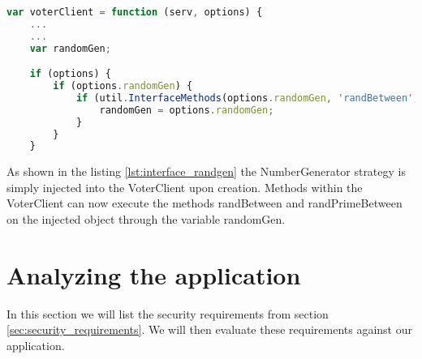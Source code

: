 \begin{lstlisting}[language=Javascript, caption=Checking for an interface, label=lst:interface_randgen]
var voterClient = function (serv, options) {
    ...
    ...
    var randomGen;                     

    if (options) {
        if (options.randomGen) {
            if (util.InterfaceMethods(options.randomGen, 'randBetween', 'randPrimeBetween')) {
                randomGen = options.randomGen;
            }
        }
    } 
\end{lstlisting}
 
\noindent
As shown in the listing \ref{lst:interface_randgen} the NumberGenerator strategy is simply injected
into the VoterClient upon creation. Methods within the VoterClient can now execute the methods
randBetween and randPrimeBetween on the injected object through the variable randomGen. 
 
 


\section{Analyzing the application}
In this section we will list the security requirements from section \ref{sec:security_requirements}.  We will then evaluate these requirements against our application. 

